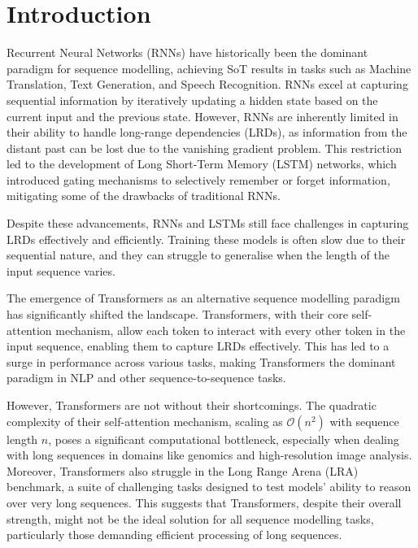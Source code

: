 \documentclass[12pt,a4paper]{report}
\begin{document}

\tableofcontents

\chapter*{Introduction}

Recurrent Neural Networks (RNNs) have historically been the dominant paradigm for sequence modelling, achieving SoT results in tasks such as Machine Translation, Text Generation, and Speech Recognition. RNNs excel at capturing sequential information by iteratively updating a hidden state based on the current input and the previous state. However, RNNs are inherently limited in their ability to handle long-range dependencies (LRDs), as information from the distant past can be lost due to the vanishing gradient problem. This restriction led to the development of Long Short-Term Memory (LSTM) networks, which introduced gating mechanisms to selectively remember or forget information, mitigating some of the drawbacks of traditional RNNs.

Despite these advancements, RNNs and LSTMs still face challenges in capturing LRDs effectively and efficiently. Training these models is often slow due to their sequential nature, and they can struggle to generalise when the length of the input sequence varies.

\medskip

The emergence of Transformers \cite{transformers} as an alternative sequence modelling paradigm has significantly shifted the landscape. Transformers, with their core self-attention mechanism, allow each token to interact with every other token in the input sequence, enabling them to capture LRDs effectively. This has led to a surge in performance across various tasks, making Transformers the dominant paradigm in NLP and other sequence-to-sequence tasks.

However, Transformers are not without their shortcomings. The quadratic complexity of their self-attention mechanism, scaling as $\mathcal{O}(n^2)$ with sequence length $n$, poses a significant computational bottleneck, especially when dealing with long sequences in domains like genomics and high-resolution image analysis. Moreover, Transformers also struggle in the Long Range Arena (LRA) benchmark, a suite of challenging tasks designed to test models' ability to reason over very long sequences. This suggests that Transformers, despite their overall strength, might not be the ideal solution for all sequence modelling tasks, particularly those demanding efficient processing of long sequences.
\end{document}
